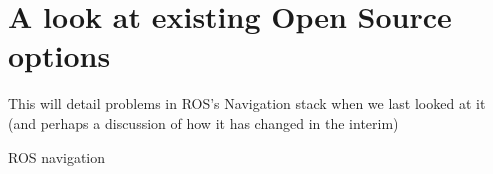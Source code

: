 \section{A look at existing Open Source options}

This will detail problems in ROS's Navigation stack when we last looked at it (and perhaps a discussion of how it has changed in the interim)

ROS navigation \autocite{ros_navigation_paper}
